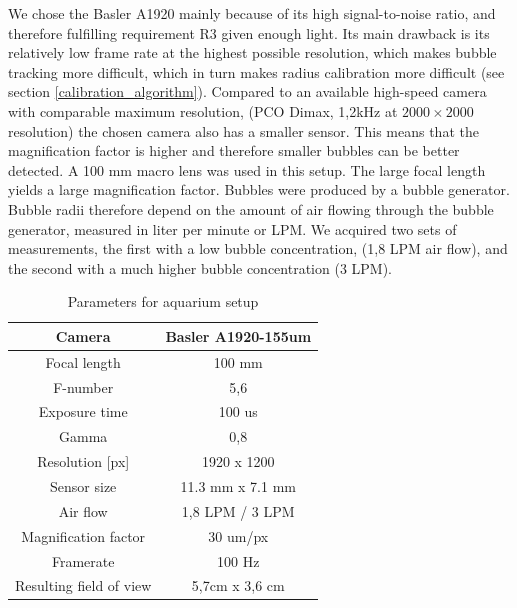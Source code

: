 		We chose the Basler A1920 mainly because of its high signal-to-noise ratio, and therefore fulfilling requirement R3 given enough light. Its main drawback is its relatively low frame rate at the highest possible resolution, which makes bubble tracking more difficult, which in turn makes radius calibration more difficult (see section \ref{calibration_algorithm}). Compared to an available high-speed camera with comparable maximum resolution, (PCO Dimax, 1,2kHz at $2000 \times 2000$ resolution) the chosen camera also has a smaller sensor. This means that the magnification factor is higher and therefore smaller bubbles can be better detected. A 100 mm macro lens was used in this setup. The large focal length yields a large magnification factor.
	Bubbles were produced by a bubble generator. Bubble radii therefore depend on the amount of air flowing through the bubble generator, measured in liter per minute or LPM. We acquired two sets of measurements, the first with a low bubble concentration, (1,8 LPM air flow), and the second with a much higher bubble concentration (3 LPM). 
		
		\begin{table}
			\centering
		
			\begin{tabular}{|c|c|}
			\hline 
			Camera & Basler A1920-155um \\ 
			\hline 
			Focal length & 100 mm \\ 
			\hline 
			F-number & 5,6 \\ 
			\hline 
			Exposure time & 100 us \\ 
			\hline 
			Gamma & 0,8 \\
			\hline
			Resolution [px] &1920 x 1200 \\
			\hline 
			Sensor size & 11.3 mm x 7.1 mm \\
			\hline
			Air flow & 1,8 LPM / 3 LPM \\ 
			\hline 
			Magnification factor & 30 um/px \\ 
			\hline 
			Framerate & 100 Hz \\ 
			\hline 
			Resulting field of view & 5,7cm x 3,6 cm \\
			\hline
			\end{tabular} 
			
			\caption{Parameters for aquarium setup}
			\label{tab:aquarium_param}

		\end{table}
		
